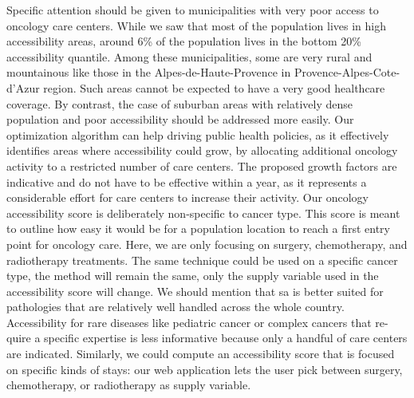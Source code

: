 Specific attention should be given to municipalities with very poor access to
oncology care centers. While we saw that most of the population lives in high
accessibility areas, around 6\% of the population lives in the bottom 20\%
accessibility quantile. Among these municipalities, some are very rural and
mountainous like those in the Alpes-de-Haute-Provence in
Provence-Alpes-Cote-d'Azur region. Such areas cannot be expected to have a very
good healthcare coverage. By contrast, the case of suburban areas with
relatively dense population and poor accessibility should be addressed more
easily. Our optimization algorithm can help driving public health policies, as
it effectively identifies areas where accessibility could grow, by allocating
additional oncology activity to a restricted number of care centers. The
proposed growth factors are indicative and do not have to be effective within a
year, as it represents a considerable effort for care centers to increase their
activity. Our oncology accessibility score is deliberately non-specific to
cancer type. This score is meant to outline how easy it would be for a
population location to reach a first entry point for oncology care. Here, we are
only focusing on surgery, chemotherapy, and radiotherapy treatments. The same
technique could be used on a specific cancer type, the method will remain the
same, only the supply variable used in the accessibility score will change. We
should mention that \ac{sa} is better suited for pathologies that are relatively
well handled across the whole country. Accessibility for rare diseases like
pediatric cancer or complex cancers that re-quire a specific expertise is less
informative because only a handful of care centers are indicated. Similarly, we
could compute an accessibility score that is focused on specific kinds of stays:
our web application lets the user pick between surgery, chemotherapy, or
radiotherapy as supply variable.

